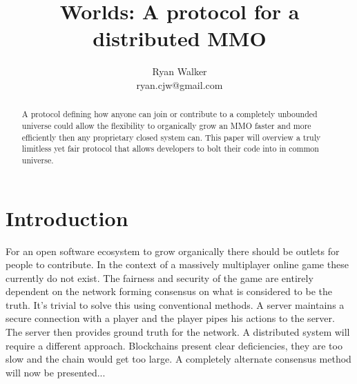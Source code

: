 \documentclass[runningheads,a4paper]{llncs}
\begin{document}
\def \SystemName {Worlds} %

\mainmatter  %

\title{\SystemName: A protocol for a distributed MMO}

\author{Ryan Walker\\
				ryan.cjw@gmail.com}

\institute{} %

\maketitle


%  

\begin{abstract}
A protocol defining how anyone can join or contribute to a completely unbounded universe could allow the flexibility to organically grow an MMO faster and more efficiently then any proprietary closed system can. This paper will overview a truly limitless yet fair protocol that allows developers to bolt their code into in common universe. 
\end{abstract}

\section{Introduction}
For an open software ecosystem to grow organically there should be outlets for people to contribute. In the context of a massively multiplayer online game these currently do not exist. The fairness and security of the game are entirely dependent on the network forming consensus on what is considered to be the truth. It's trivial to solve this using conventional methods. A server maintains a secure connection with a player and the player pipes his actions to the server. The server then provides ground truth for the network. A distributed system will require a different approach. Blockchains present clear deficiencies, they are too slow and the chain would get too large. A completely alternate consensus method will now be presented...
\end{document}
